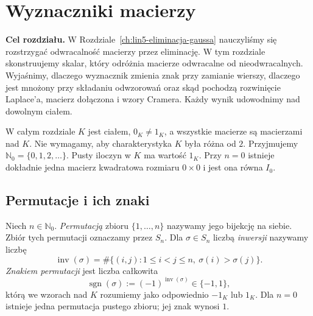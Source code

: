 \chapter{Wyznaczniki macierzy}
\label{ch:lin6-wyznaczniki}

\noindent\textbf{Cel rozdziału.}
W Rozdziale~\ref{ch:lin5-eliminacja-gaussa}
nauczyliśmy się rozstrzygać odwracalność macierzy
przez eliminację. W tym rozdziale skonstruujemy
skalar, który odróżnia macierze odwracalne
od nieodwracalnych. Wyjaśnimy, dlaczego
wyznacznik zmienia znak przy zamianie wierszy,
dlaczego jest mnożony przy składaniu
odwzorowań oraz skąd pochodzą rozwinięcie
Laplace'a, macierz dołączona i wzory Cramera.
Każdy wynik udowodnimy nad dowolnym ciałem.

W całym rozdziale \(K\) jest ciałem,
\(0_K\ne1_K\), a wszystkie macierze
są macierzami nad \(K\).
Nie wymagamy, aby charakterystyka \(K\)
była różna od \(2\). Przyjmujemy
\(\mathbb N_0=\{0,1,2,\ldots\}\).
Pusty iloczyn w \(K\) ma wartość \(1_K\).
Przy \(n=0\) istnieje dokładnie jedna
macierz kwadratowa rozmiaru \(0\times0\)
i jest ona równa \(I_0\).

\section{Permutacje i ich znaki}
\label{sec:lin6-permutacje}

\begin{definicja}
\label{def:lin6-permutacja-znak}
Niech \(n\in\mathbb N_0\).
\emph{Permutacją} zbioru
\(\{1,\ldots,n\}\) nazywamy jego bijekcję
na siebie. Zbiór tych permutacji
oznaczamy przez \(S_n\).
Dla \(\sigma\in S_n\) liczbą
\emph{inwersji} nazywamy liczbę
\[
 \operatorname{inv}(\sigma)=
 \#\{(i,j):1\leq i<j\leq n,\ 
                 \sigma(i)>\sigma(j)\}.
\]
\emph{Znakiem permutacji} jest liczba całkowita
\[
 \operatorname{sgn}(\sigma)
 :=(-1)^{\operatorname{inv}(\sigma)}
 \in\{-1,1\},
\]
którą we wzorach nad \(K\) rozumiemy
jako odpowiednio \(-1_K\) lub \(1_K\).
Dla \(n=0\) istnieje jedna permutacja
pustego zbioru; jej znak wynosi \(1\).
\end{definicja}

